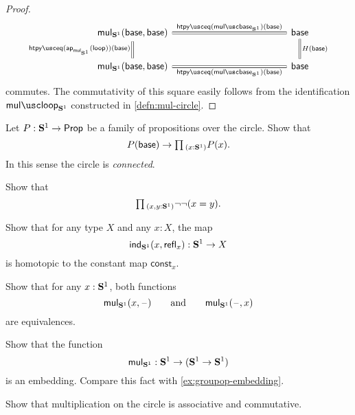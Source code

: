 \begin{proof}
  \begin{equation*}
    \begin{tikzcd}[column sep=12em]
      \mulcircle(\base,\base) \arrow[d,equals,swap,"\htpyeq(\ap{\mulcircle}{\lloop})(\base)"] \arrow[r,equals,"\htpyeq(\mulcirclebase)(\base)"] & \base \arrow[d,equals,"H(\base)"] \\
      \mulcircle(\base,\base) \arrow[r,equals,swap,"\htpyeq(\mulcirclebase)(\base)"] & \base
    \end{tikzcd}
  \end{equation*}
  commutes. The commutativity of this square easily follows from the identification $\mulcircleloop$ constructed in \cref{defn:mul-circle}.
\end{proof}

\begin{exercises}
\item \label{ex:circle-connected}Let $P:\mathbf{S}^{1}\to\mathsf{Prop}$ be a family of propositions over the circle. Show that
\begin{equation*}
P(\base)\to\prd{x:\sphere{1}}P(x).
\end{equation*}
In this sense the circle is \emph{connected}.
\item Show that
\begin{equation*}
\prd{x,y:\sphere{1}}\neg\neg(x=y).
\end{equation*}
\item \label{ex:circle-constant}
Show that for any type $X$ and any $x:X$, the map
\begin{equation*}
\mathsf{ind}_{\mathbf{S}^{1}}(x,\mathsf{refl}_{x}):\mathbf{S}^{1}\to X
\end{equation*}
is homotopic to the constant map $\mathsf{const}_x$.
\item
  \begin{subexenum}
  \item Show that for any $x:\mathbf{S}^{1}$, both functions
    \begin{equation*}
      \mathsf{mul}_{\mathbf{S}^{1}}(x,\mathord{\hspace{1pt}\text{--}\hspace{1pt}})\qquad\text{and}\qquad\mathsf{mul}_{\mathbf{S}^{1}}(\mathord{\hspace{1pt}\text{--}\hspace{1pt}},x)
    \end{equation*}
    are equivalences.
  \item Show that the function
    \begin{equation*}
      \mathsf{mul}_{\mathbf{S}^{1}} : \mathbf{S}^{1}\to(\mathbf{S}^{1}\to\mathbf{S}^{1})
    \end{equation*}
    is an embedding. Compare this fact with \cref{ex:groupop-embedding}.
  \item Show that multiplication on the circle is associative and commutative.

\end{subexenum}
\end{exercises}

